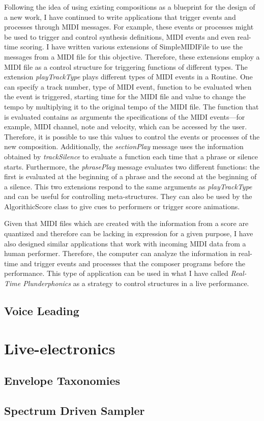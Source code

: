 Following the idea of using existing compositions as a blueprint for the design of a new work, I have continued to write applications that trigger events and processes through MIDI messages. For example, these events or processes might be used to trigger and control synthesis definitions, MIDI events and even real-time scoring. I have written various extensions of SimpleMIDIFile to use the messages from a MIDI file for this objective. Therefore, these extensions employ a MIDI file as a control structure for triggering functions of different types.
The extension \emph{playTrackType} plays different types of MIDI events in a Routine. One can specify a track number, type of MIDI event, function to be evaluated when the event is triggered, starting time for the MIDI file and  value to change the tempo by multiplying it to the original tempo of the MIDI file. The function that is evaluated contains as arguments the specifications of the MIDI events---for example, MIDI channel, note and velocity, which can be accessed by the user. Therefore, it is possible to use this values to control the events or processes of the new composition. Additionally, the \emph{sectionPlay} message uses the information obtained by \emph{trackSilence} to evaluate a function each time that a phrase or silence starts. Furthermore, the \emph{phrasePlay} message evaluates two different functions: the first is evaluated at the beginning of a phrase and the second at the beginning of a silence. This two extensions respond to the same arguments as \emph{playTrackType} and can be useful for controlling meta-structures. They can also be used by the AlgorithicScore class to give cues to performers or trigger score animations. 

Given that MIDI files which are created with the information from a score are quantized and therefore can be lacking in expression for a given purpose, I have also designed similar applications that work with incoming MIDI data from a human performer. Therefore, the computer can analyze the information in real-time and trigger events and processes that the composer programs before the performance. This type of application can be used in what I have called \emph{Real-Time Plunderphonics} as a strategy to control structures in a live performance.

\subsection{Voice Leading}

\section{Live-electronics}

\subsection{Envelope Taxonomies}

\subsection{Spectrum Driven Sampler}


\label{ch:compamp}